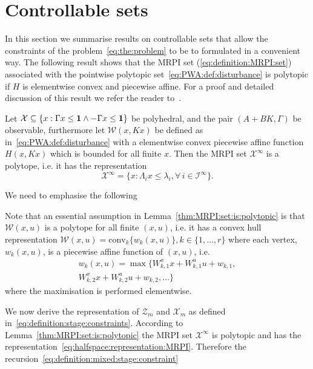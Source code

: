\documentclass{ifacconf}
\providecommand{\conv}{\text{conv}}
\begin{document}
\section{Controllable sets}\label{sec:preliminaries}
In this section we summarise results on controllable sets that allow the constraints of the problem~\eqref{eq:the:problem} to be to formulated
in a convenient way. The following result shows that the MRPI set (\ref{eq:definition:MRPI:set}) associated
with the pointwise polytopic set~\eqref{eq:PWA:def:disturbance} is polytopic if $H$ is elementwise convex and
piecewise affine. For a proof and detailed discussion of this result we refer the reader
to~\cite{Schaich:2015}.
%
\begin{lem}\label{thm:MRPI:set:is:polytopic}
Let $\mathcal X \subseteq \{x:\Gamma x\leq{\bf{1}}\wedge-\Gamma x\leq{\bf{1}}\}$ be polyhedral, and the pair $(A+BK,\Gamma)$ be
observable, furthermore let $\mathcal W(x,Kx)$ be defined as in~\eqref{eq:PWA:def:disturbance} with a elementwise convex piecewise
affine function $H(x,Kx)$ which is bounded for all finite $x$. Then the MRPI set $\mathcal X^\infty$ is a polytope, i.e.
it has the representation 
\begin{equation}\label{eq:halfspace:representation:MRPI}
	\mathcal X^\infty=\{x:\Lambda_i x\leq \lambda_i, \forall\, i\in\mathcal I^\infty\}.
\end{equation}
\end{lem}
%
We need to emphasise the following 
\begin{rem}\label{rem:vertex:representation}
Note that an essential assumption in Lemma~\ref{thm:MRPI:set:is:polytopic} is that $\mathcal W(x,u)$ is a polytope
for all finite $(x,u)$, i.e. it has a convex hull representation $\mathcal W(x,u) = \conv_k\{w_k(x,u)\}, k\in\{1,\dots,r\}$ where each 
vertex, $w_k(x,u)$, is a piecewise affine function of $(x,u)$, i.e.
\begin{multline}
	w_k(x,u) = \max\{W_{k,1}^x x + W_{k,1}^u u + w_{k,1}, \\
        W_{k,2}^x x + W_{k,2}^u u + w_{k,2},\dots\}
\end{multline}
where the maximisation is performed elementwise.
\end{rem}
%
We now derive the representation of $\mathcal Z_m$ and $\mathcal X_m$ as defined in~\eqref{eq:definition:stage:constraints}.
According to Lemma~\ref{thm:MRPI:set:is:polytopic} the MRPI set $\mathcal X^\infty$ is polytopic and has the 
representation~\eqref{eq:halfspace:representation:MRPI}. Therefore the recursion~\eqref{eq:definition:mixed:stage:constraint}
\end{document}
